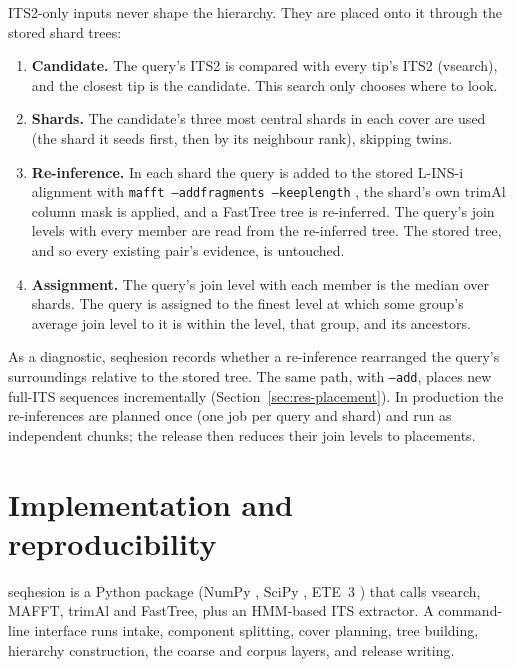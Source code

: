 \documentclass[11pt,a4paper]{article}
\newcommand{\seqhesion}{\textsf{seqhesion}}
\begin{document}
ITS2-only inputs never shape the hierarchy. They are placed onto it through the stored shard trees:
\begin{enumerate}
  \item \textbf{Candidate.} The query's ITS2 is compared with every tip's ITS2 (vsearch), and the
        closest tip is the candidate. This search only chooses where to look.
  \item \textbf{Shards.} The candidate's three most central shards in each cover are used (the
        shard it seeds first, then by its neighbour rank), skipping twins.
  \item \textbf{Re-inference.} In each shard the query is added to the stored L-INS-i alignment with
        \texttt{mafft --addfragments --keeplength} \citep{katoh2012add}, the shard's own trimAl
        column mask is applied, and a FastTree tree is re-inferred. The query's join levels with
        every member are read from the re-inferred tree. The stored tree, and so every existing pair's
        evidence, is untouched.
  \item \textbf{Assignment.} The query's join level with each member is the median over shards. The
        query is assigned to the finest level at which some group's average join level to it is
        within the level, that group, and its ancestors.
\end{enumerate}
As a diagnostic, \seqhesion{} records whether a re-inference rearranged the query's surroundings
relative to the stored tree. The same path, with \texttt{--add}, places new full-ITS sequences
incrementally (Section~\ref{sec:res-placement}). In production the re-inferences are planned once
(one job per query and shard) and run as independent chunks; the release then reduces their
join levels to placements.

\section{Implementation and reproducibility}\label{sec:impl}

\seqhesion{} is a Python package (NumPy \citep{harris2020numpy}, SciPy \citep{virtanen2020scipy},
ETE~3 \citep{huerta2016ete3}) that calls vsearch, MAFFT, trimAl and FastTree, plus an HMM-based ITS
extractor. A command-line interface runs intake, component splitting, cover planning, tree building,
hierarchy construction, the coarse and corpus layers, and release writing.
\end{document}
